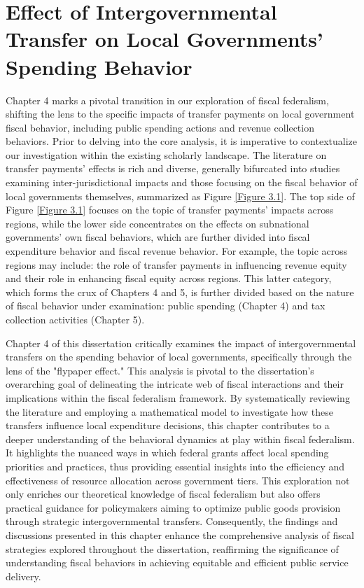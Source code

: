 
\chapter{Effect of Intergovernmental Transfer on Local Governments' Spending Behavior}

Chapter 4 marks a pivotal transition in our exploration of fiscal federalism, shifting the lens to the specific impacts of transfer payments on local government fiscal behavior, including public spending actions and revenue collection behaviors. Prior to delving into the core analysis, it is imperative to contextualize our investigation within the existing scholarly landscape. The literature on transfer payments' effects is rich and diverse, generally bifurcated into studies examining inter-jurisdictional impacts and those focusing on the fiscal behavior of local governments themselves, summarized as Figure \ref*{Figure 3.1}. The top side of Figure \ref{Figure 3.1} focuses on the topic of transfer payments' impacts across regions, while the lower side concentrates on the effects on subnational governments' own fiscal behaviors, which are further divided into fiscal expenditure behavior and fiscal revenue behavior. For example, the topic across regions may include: the role of transfer payments in influencing revenue equity and their role in enhancing fiscal equity across regions. This latter category, which forms the crux of Chapters 4 and 5, is further divided based on the nature of fiscal behavior under examination: public spending (Chapter 4) and tax collection activities (Chapter 5).

Chapter 4 of this dissertation critically examines the impact of intergovernmental transfers on the spending behavior of local governments, specifically through the lens of the "flypaper effect." This analysis is pivotal to the dissertation's overarching goal of delineating the intricate web of fiscal interactions and their implications within the fiscal federalism framework. By systematically reviewing the literature and employing a mathematical model to investigate how these transfers influence local expenditure decisions, this chapter contributes to a deeper understanding of the behavioral dynamics at play within fiscal federalism. It highlights the nuanced ways in which federal grants affect local spending priorities and practices, thus providing essential insights into the efficiency and effectiveness of resource allocation across government tiers. This exploration not only enriches our theoretical knowledge of fiscal federalism but also offers practical guidance for policymakers aiming to optimize public goods provision through strategic intergovernmental transfers. Consequently, the findings and discussions presented in this chapter enhance the comprehensive analysis of fiscal strategies explored throughout the dissertation, reaffirming the significance of understanding fiscal behaviors in achieving equitable and efficient public service delivery.

